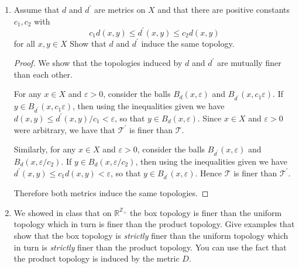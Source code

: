 \documentclass[11pt]{article}
\begin{document}
\begin{enumerate}
\begin{proof}
      Hence $h$ is a homeomorphism as desired, so that $\prod_{\lambda\in\Lambda}X_\lambda$ and $\prod_{\lambda\in\Lambda}Y_{\lambda}$ are homeomorphic.
    \end{proof}
    \item Assume that $d$ and $d^{\prime}$ are metrics on $X$ and that there are positive constants $c_1,c_2$ with \[c_1d(x,y)\leq d^{\prime}(x,y)\leq c_2d(x,y)\] for all $x,y\in X$ Show that $d$ and $d^{\prime}$ induce the same topology.
    \begin{proof}
      We show that the topologies induced by $d$ and $d^{\prime}$ are mutually finer than each other.

      For any $x\in X$ and $\varepsilon >0$, consider the balls $B_d(x,\varepsilon)$ and $B_{d^{\prime}}(x,c_1\varepsilon)$. If $y\in B_{d^{\prime}}(x,c_1\varepsilon)$, then using the inequalities given we have $d(x,y)\leq d^{\prime}(x,y)/c_1 < \varepsilon$, so that $y\in B_d(x,\varepsilon)$. Since $x\in X$ and $\varepsilon>0$ were arbitrary, we have that $\mathcal{T}^{\prime}$ is finer than $\mathcal{T}$.

      Similarly, for any $x\in X$ and $\varepsilon> 0$, consider the balls $B_{d^{\prime}}(x,\varepsilon)$ and $B_d(x,\varepsilon/c_2)$. If $y\in B_d(x,\varepsilon/c_2)$, then using the inequalities given we have $d^{\prime}(x,y)\leq c_1d(x,y) < \varepsilon$, so that $y\in B_{d^{\prime}}(x,\varepsilon)$. Hence $\mathcal{T}$ is finer than $\mathcal{T}^{\prime}$.

      Therefore both metrics induce the same topologies.
    \end{proof}
    \item We showed in class that on $\mathbb{R}^{\mathbb{Z}_+}$ the box topology is finer than the uniform topology which in turn is finer than the product topology. Give examples that show that the box topology is \textit{strictly} finer than the uniform topology which in turn is \textit{strictly} finer than the product topology. You can use the fact that the product topology is induced by the metric $D$.
    

\end{enumerate}
\end{document}
